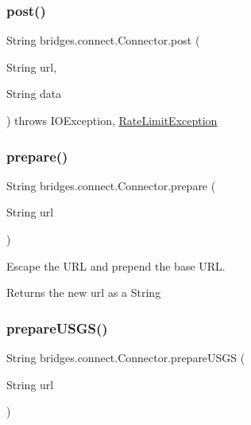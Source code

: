 \subsubsection{\texorpdfstring{post()}{post()}\hspace{0.1cm}{\footnotesize\ttfamily [2/2]}}
{\footnotesize\ttfamily String bridges.\+connect.\+Connector.\+post (\begin{DoxyParamCaption}\item[{String}]{url,  }\item[{String}]{data }\end{DoxyParamCaption}) throws I\+O\+Exception, 		\hyperlink{classbridges_1_1validation_1_1_rate_limit_exception}{Rate\+Limit\+Exception}}

\mbox{\label{classbridges_1_1connect_1_1_connector_a507ee5a9d8c812ffd4629cbd22f27373}} 
\subsubsection{\texorpdfstring{prepare()}{prepare()}}
{\footnotesize\ttfamily String bridges.\+connect.\+Connector.\+prepare (\begin{DoxyParamCaption}\item[{String}]{url }\end{DoxyParamCaption})}

Escape the U\+RL and prepend the base U\+RL. \begin{DoxyReturn}{Returns}
the new url as a String 
\end{DoxyReturn}
\mbox{\label{classbridges_1_1connect_1_1_connector_aa0201e2569358ff906d3c14d654711e5}} 
\subsubsection{\texorpdfstring{prepare\+U\+S\+G\+S()}{prepareUSGS()}}
{\footnotesize\ttfamily String bridges.\+connect.\+Connector.\+prepare\+U\+S\+GS (\begin{DoxyParamCaption}\item[{String}]{url }\end{DoxyParamCaption})}

